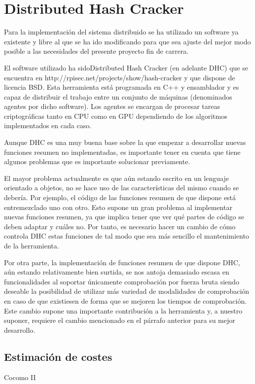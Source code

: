 \chapter{Distributed Hash Cracker}

Para la implementación del sistema distribuido se ha utilizado un software ya existente y libre al que se ha ido modificando para que sea ajuste del mejor modo posible a las necesidades del presente proyecto fin de carrera.

El software utilizado ha sidoDistributed Hash Cracker (en adelante DHC) que se encuentra en http://rpisec.net/projects/show/hash-cracker y que dispone de licencia BSD. Esta herramienta está programada en C++ y ensamblador y es capaz de distribuir el trabajo entre un conjunto de máquinas (denominados agentes por dicho software). Los agentes se encargan de procesar tareas criptográficas tanto en CPU como en GPU dependiendo de los algoritmos implementados en cada caso.

Aunque DHC es una muy buena base sobre la que empezar a desarrollar nuevas funciones resumen no implementadas, es importante tener en cuenta que tiene algunos problemas que es importante solucionar previamente.

El mayor problema actualmente es que aún estando escrito en un lenguaje orientado a objetos, no se hace uso de las características del mismo cuando se debería. Por ejemplo, el código de las funciones resumen de que dispone está entremezclado uno con otro. Esto supone un gran problema al implementar nuevas funciones resumen, ya que implica tener que ver qué partes de código se deben adaptar y cuáles no. Por tanto, es necesario hacer un cambio de cómo controla DHC estas funciones de tal modo que sea más sencillo el mantenimiento de la herramienta.

Por otra parte, la implementación de funciones resumen de que dispone DHC, aún estando relativamente bien surtida, se nos antoja demasiado escasa en funcionalidades al soportar únicamente comprobación por fuerza bruta siendo deseable la posibilidad de utilizar más variedad de modalidades de comprobación en caso de que existiesen de forma que se mejoren los tiempos de comprobación. Este cambio supone una importante contribución a la herramienta y, a nuestro suponer, requiere el cambio mencionado en el párrafo anterior para su mejor desarrollo.

\section{Estimación de costes}
Cocomo II

